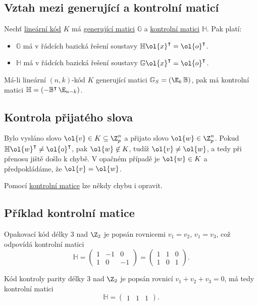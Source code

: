 \subsection{Vztah mezi generující a kontrolní maticí}
Nechť \hyperref[linKod]{lineární kód} $K$ má \hyperref[genMat]{generující matici} $\mathbb{G}$ a \hyperref[kontMat]{kontrolní matici} $\mathbb{H}$. Pak platí:
\vspace{-1em}
\begin{itemize}
	\item $\mathbb{G}$ má v řádcích bazická řešení soustavy $\mathbb{H}\ol{x}^\intercal = \ol{o}^\intercal$.
	\item $\mathbb{H}$ má v řádcích bazická řešení soustavy $\mathbb{G}\ol{x}^\intercal = \ol{o}^\intercal$.
\end{itemize}
Má-li lineární $(n,k)$-kód $K$ generující matici $\mathbb{G}_S = \left(\E_k \, \mathbb{B}\right)$, pak má kontrolní matici $\mathbb{H} = \left(-\mathbb{B}^\intercal \, \E_{n-k}\right)$.

\subsection{Kontrola přijatého slova}
Bylo vysláno slovo $\ol{v} \in K \subseteq \Z_p^n$ a přijato slovo $\ol{w} \in \Z_p^n$. Pokud $\mathbb{H}\ol{w}^\intercal \not= \ol{o}^\intercal$, pak $\ol{w} \not\in K$, tudíž $\ol{v} \not= \ol{w}$, a tedy při přenosu jiště došlo k chybě. V opačném případě je $\ol{w} \in K$ a předpokládáme, že $\ol{v} = \ol{w}$.

Pomocí \hyperref[kontMat]{kontrolní matice} lze někdy chybu i opravit.

\subsection{Příklad kontrolní matice}
Opakovací kód délky 3 nad $\Z_2$ je popsán rovnicemi $v_1 = v_2$, $v_1 = v_3$, což odpovídá kontrolní matici
\begin{equation}
	\mathbb{H} = \begin{pmatrix}1 & -1 & 0 \\ 1 & 0 & -1\end{pmatrix} = \begin{pmatrix}1 & 1 & 0 \\ 1 & 0 & 1\end{pmatrix}.
\end{equation}

Kód kontroly parity délky 3 nad $\Z_2$ je popsán rovnicí $v_1 + v_2 + v_3 = 0$, má tedy kontrolní matici
\begin{equation}
	\mathbb{H} = \begin{pmatrix} 1 & 1 & 1 \end{pmatrix}.
\end{equation}

